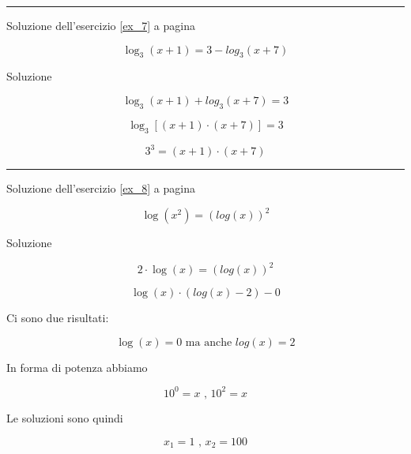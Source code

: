 \vspace{1cm}
\hrule
\vspace{1cm}



Soluzione dell'esercizio \ref{ex_7} a pagina \pageref{ex_7}\label{sol_7}

\begin{equation*}
\log_3(x+1)=3-log_3(x+7)
\end{equation*}

Soluzione

\begin{equation*}
\log_3(x+1)+log_3(x+7)=3
\end{equation*}

\begin{equation*}
\log_3[(x+1) \cdot (x+7)]=3
\end{equation*}

\begin{equation*}
3^3=(x+1) \cdot (x+7)
\end{equation*}



\vspace{1cm}
\hrule
\vspace{1cm}


\begin{minipage}{\textwidth}
Soluzione dell'esercizio \ref{ex_8} a pagina \pageref{ex_8}\label{sol_8}

\begin{equation*}
\log(x^2)=(log(x))^2 
\end{equation*}

Soluzione

\begin{equation*}
2\cdot \log(x)=(log(x))^2 
\end{equation*}

\begin{equation*}
\log(x)\cdot (log(x)-2)-0
\end{equation*}

Ci sono due risultati:

\begin{equation*}
\log(x)=0\textrm{ ma anche }log(x)=2
\end{equation*}

In forma di potenza abbiamo

\begin{equation*}
10^0=x \textrm{ , } 10^2=x
\end{equation*}

Le soluzioni sono quindi

\begin{equation*}
x_1=1 \textrm{ , } x_2=100
\end{equation*}

\end{minipage}



